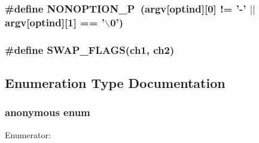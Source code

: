\subsubsection{\setlength{\rightskip}{0pt plus 5cm}\#define NONOPTION\_\-P~(argv[{\bf optind}][0] != '-' $|$$|$ argv[{\bf optind}][1] == '$\backslash$0')}\label{TestMasterSlave_2getopt_8c_71ceb8911d64b39b402041ba5ea8453c}


\subsubsection{\setlength{\rightskip}{0pt plus 5cm}\#define SWAP\_\-FLAGS(ch1, ch2)}\label{TestMasterSlave_2getopt_8c_6e06e56c5fa96faaf47f3b231e015e35}




\subsection{Enumeration Type Documentation}
\subsubsection{\setlength{\rightskip}{0pt plus 5cm}anonymous enum}\label{TestMasterSlave_2getopt_8c_df764cbdea00d65edcd07bb9953ad2b7}


\begin{Desc}
\item[Enumerator: ]\par
\begin{description}
\item[{\em 
REQUIRE\_\-ORDER\label{TestMasterSlave_2getopt_8c_df764cbdea00d65edcd07bb9953ad2b70e73a0691c110b1442d8364d1d12eccc}
}]\item[{\em 
PERMUTE\label{TestMasterSlave_2getopt_8c_df764cbdea00d65edcd07bb9953ad2b7cfdde4b47c27f4efbd832e1ac7f8a8fc}
}]\item[{\em 
RETURN\_\-IN\_\-ORDER\label{TestMasterSlave_2getopt_8c_df764cbdea00d65edcd07bb9953ad2b73c56550bfafe809d9214b863b69c31c5}
}]\end{description}
\end{Desc}



